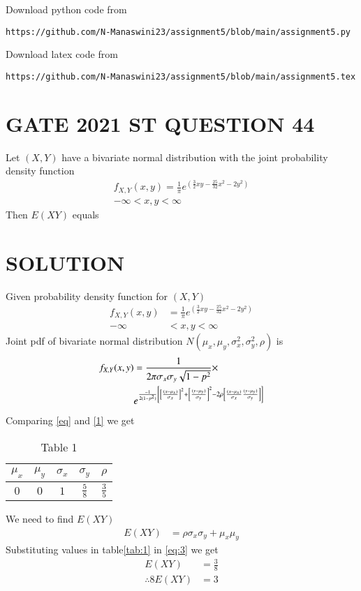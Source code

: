 \documentclass[journal,12pt,twocolumn]{IEEEtran}
\begin{document}
\renewcommand{\thefigure}{\theenumi}
\renewcommand{\thetable}{\theenumi}
Download python code from 
\begin{lstlisting}
https://github.com/N-Manaswini23/assignment5/blob/main/assignment5.py
\end{lstlisting}
%
Download latex code from 
\begin{lstlisting}
https://github.com/N-Manaswini23/assignment5/blob/main/assignment5.tex
\end{lstlisting}
%

\section*{GATE 2021 ST QUESTION 44}
Let $(X,Y)$ have a bivariate normal distribution with the joint probability density function
\begin{align}
f_{X,Y}(x,y)=\frac{1}{\pi}e^{(\frac{3}{2}xy-\frac{25}{32}x^2-2y^2)}\\
-\infty < x,y < \infty
\end{align}
Then $E(XY)$ equals 
\section*{SOLUTION}
Given probability density function for $(X,Y)$
\begin{align}
f_{X,Y}(x,y)&=\frac{1}{\pi}e^{(\frac{3}{2}xy-\frac{25}{32}x^2-2y^2)} \label{1} \\ 
-\infty &< x,y < \infty
\end{align}
Joint pdf of bivariate normal distribution $N(\mu_x,\mu_y,\sigma_x^2,\sigma_y^2,\rho)$ is
\begin{align}
f_{X,Y}(x,y)&=\frac{1}{2\pi\sigma_x\sigma_y\sqrt{1-p^2}} \times \notag \\ &e^{\frac{-1}{2(1-p^2)}{}\left[{}\left[\frac{(x-\mu_x)}{\sigma_x}\right]^2+{}\left[\frac{(y-\mu_y)}{\sigma_y}\right]^2-2\rho{}\left[\frac{(x-\mu_x)}{\sigma_x}\frac{(y-\mu_y)}{\sigma_y}\right]\right]} \label{eq}
\end{align}
Comparing \eqref{eq} and \eqref{1} we get 

\begin{table}[h!]
\resizebox{7cm}{!}
{
\begin{tabular}{|c|c|c|c|c|}
\hline
$\mu_x$ & $\mu_y$ & $\sigma_x$ & $\sigma_y$ & $\rho$ \\
\hline
$0$ & $0$ & $1$ & $\frac{5}{8}$ & $\frac{3}{5}$\\
\hline
\end{tabular}
}
\caption{Table 1} 
\label{tab:1}
\end{table}

We need to find $E(XY)$
\begin{align}
E(XY)&=\rho \sigma_x\sigma_y+\mu_x\mu_y \label{eq:3}
\end{align}
Substituting values in table\eqref{tab:1} in \eqref{eq:3} we get
\begin{align}
E(XY)&=\frac{3}{8} \label{6}\\
\therefore 8E(XY)&=3
\end{align}
\end{document}
